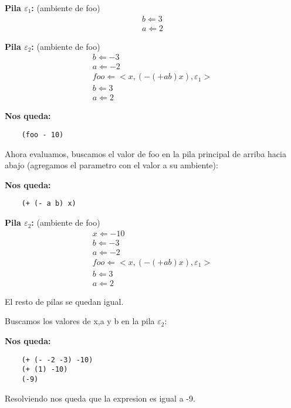 \textbf{Pila $\varepsilon_1$:} (ambiente de foo)
\[
\begin{array}{c}
    b \Leftarrow 3 \\
    a \Leftarrow 2
\end{array}
\]

\textbf{Pila $\varepsilon_2$:} (ambiente de foo)
\[
\begin{array}{c}
    b \Leftarrow -3 \\
    a \Leftarrow -2 \\
    foo \Leftarrow <x,(- (+ a b) x),\varepsilon_1> \\
    b \Leftarrow 3 \\
    a \Leftarrow 2
\end{array}
\]

\textbf{Nos queda:}
\begin{verbatim}
    (foo - 10)
\end{verbatim}

Ahora evaluamos, buscamos el valor de foo en la pila principal 
de arriba hacia abajo (agregamos el parametro con el valor a su ambiente): \vspace{.3cm}

\textbf{Nos queda:}
\begin{verbatim}
    (+ (- a b) x)
\end{verbatim}

\textbf{Pila $\varepsilon_2$:} (ambiente de foo)
\[
\begin{array}{c}
    x \Leftarrow -10 \\
    b \Leftarrow -3 \\
    a \Leftarrow -2 \\
    foo \Leftarrow <x,(- (+ a b) x),\varepsilon_1> \\
    b \Leftarrow 3 \\
    a \Leftarrow 2
\end{array}
\]

El resto de pilas se quedan igual. \vspace{.3cm}

Buscamos los valores de x,a y b en la pila $\varepsilon_2$: \vspace{.3cm}

\textbf{Nos queda:}
\begin{verbatim}
    (+ (- -2 -3) -10)
    (+ (1) -10)
    (-9)
\end{verbatim}

Resolviendo nos queda que la expresion es igual a -9.